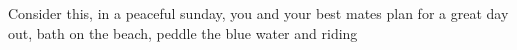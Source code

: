 Consider this, in a peaceful sunday, you and your best mates plan for a great day out, bath on the beach, peddle the blue water and riding 